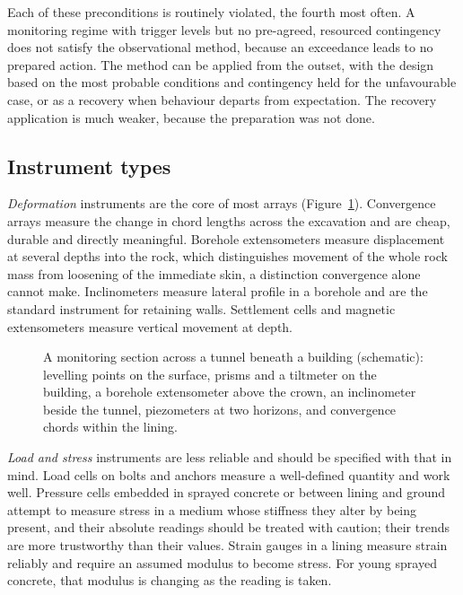 Each of these preconditions is routinely violated, the fourth most often. A
monitoring regime with trigger levels but no pre-agreed, resourced contingency
does not satisfy the observational method, because an exceedance leads to no
prepared action. The
method can be applied from the outset, with the design based on the most
probable conditions and contingency held for the unfavourable case, or as a
recovery when behaviour departs from expectation. The recovery
application is much weaker, because the preparation was not done.

\subsection{Instrument types}
\label{sec:instrument-types}

\emph{Deformation} instruments are the core of most arrays
(Figure~\ref{fig:instrument-section}). Convergence arrays measure
the change in chord lengths across the excavation and are cheap, durable and
directly meaningful. Borehole extensometers measure displacement at several
depths into the rock, which distinguishes movement of the whole rock mass from
loosening of the immediate skin, a distinction convergence alone cannot
make. Inclinometers measure lateral profile in a borehole and are the standard
instrument for retaining walls. Settlement cells and magnetic extensometers
measure vertical movement at depth.

\begin{figure}[htbp]
\centering
{}
\caption{A monitoring section across a tunnel beneath a building (schematic): levelling points on the surface, prisms and a tiltmeter on the building, a borehole extensometer above the crown, an inclinometer beside the tunnel, piezometers at two horizons, and convergence chords within the lining.}
\label{fig:instrument-section}
\end{figure}

\emph{Load and stress} instruments are less reliable and should be specified
with that in mind. Load cells on bolts and anchors measure a well-defined
quantity and work well. Pressure cells embedded in sprayed concrete or between lining
and ground attempt to measure stress in a medium whose stiffness they alter by
being present, and their absolute readings should be treated with caution;
their trends are more trustworthy than their values. Strain gauges in a lining
measure strain reliably and require an assumed modulus to become stress. For
young sprayed concrete, that modulus is changing as the reading is taken.


